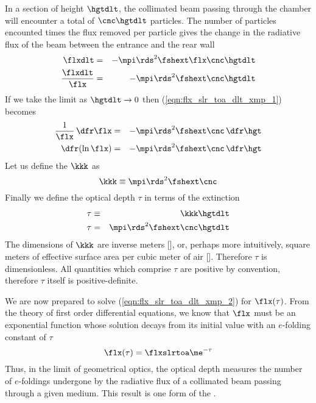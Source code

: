 \documentclass[12pt]{article}
\begin{document}
In a section of height $\hgtdlt$, the collimated beam passing
through the chamber will encounter a total of $\cnc \hgtdlt$
particles. 
The number of particles encounted times the flux removed per particle
gives the change in the radiative flux of the beam between the
entrance and the rear wall
\begin{eqnarray}
\flxdlt & = & - \mpi \rds^{2} \fshext \flx \cnc \hgtdlt \nonumber \\
\frac{\flxdlt}{\flx} & = & - \mpi \rds^{2} \fshext \cnc \hgtdlt
\label{eqn:flx_slr_toa_dlt_xmp_1}
\end{eqnarray}
If we take the limit as $\hgtdlt \rightarrow 0$ then
(\ref{eqn:flx_slr_toa_dlt_xmp_1}) becomes 
\begin{eqnarray}
\frac{1}{\flx} \,\dfr\flx & = & -  \mpi \rds^{2} \fshext \cnc \,\dfr\hgt
\nonumber \\
{\dfr(\ln \flx)} & = & - \mpi \rds^{2} \fshext \cnc \,\dfr\hgt
\label{eqn:flx_slr_toa_dlt_xmp_2}
\end{eqnarray}
Let us define the  $\kkk$ as
\begin{equation}
\kkk \equiv \mpi \rds^{2} \fshext \cnc
\label{eqn:ext_xmp_2}
\end{equation}
Finally we define the optical depth $\tau$ in terms of the extinction
\begin{eqnarray}
\tau & \equiv & \kkk \hgtdlt \\
\tau & = & \mpi \rds^{2} \fshext \cnc \hgtdlt
\label{eqn:tau_xmp_2}
\end{eqnarray}
The dimensions of $\kkk$ are inverse meters [\xm], or, perhaps more
intuitively, square meters of effective surface area per cubic meter
of air [\mSxmC].
Therefore $\tau$ is dimensionless. 
All quantities which comprise $\tau$ are positive by convention,
therefore $\tau$ itself is positive-definite.

We are now prepared to solve (\ref{eqn:flx_slr_toa_dlt_xmp_2}) for
$\flx(\tau)$. 
From the theory of first order differential equations, we know that
$\flx$ must be an exponential function whose solution decays from its
initial value with an $e$-folding constant of $\tau$ 
\begin{equation}
\flx(\tau) = \flxslrtoa \me^{-\tau}
\label{eqn:flx_slr_toa_dlt_xmp_4}
\end{equation}
Thus, in the limit of geometrical optics, the optical depth measures
the number of $e$-foldings undergone by the radiative flux of a
collimated beam passing through a given medium.  
This result is one form of the .
\end{document}
